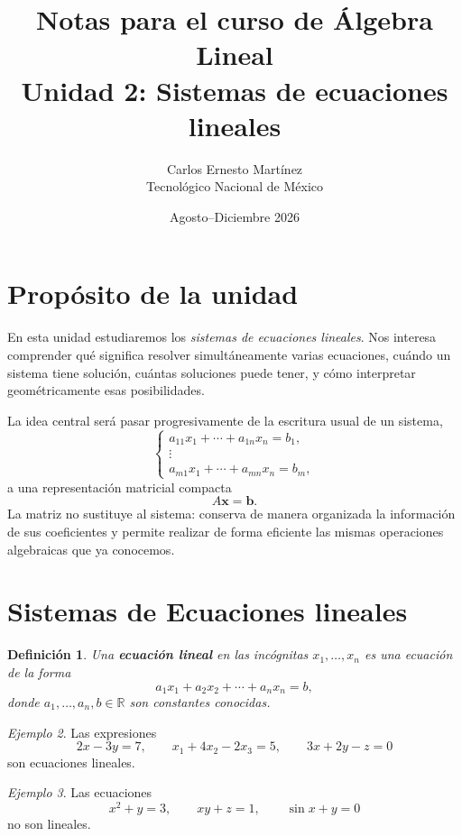 \documentclass[12pt]{article}
\title{\textbf{Notas para el curso de Álgebra Lineal}\\[0.35cm]
\Large Unidad 2: Sistemas de ecuaciones lineales}
\author{Carlos Ernesto Martínez\\Tecnológico Nacional de México}
\date{Agosto--Diciembre 2026}
\newtheorem{definicion}{Definición}[section]
\theoremstyle{remark}
\newtheorem{ejemplo}[definicion]{Ejemplo}
\newcommand{\R}{\mathbb{R}}
\begin{document}
\maketitle
\tableofcontents
\newpage
\section*{Propósito de la unidad}
En esta unidad estudiaremos los \emph{sistemas de ecuaciones lineales}. Nos interesa comprender qué significa resolver simultáneamente varias ecuaciones, cuándo un sistema tiene solución, cuántas soluciones puede tener, y cómo interpretar geométricamente esas posibilidades.

La idea central será pasar progresivamente de la escritura usual de un sistema,
\[
\begin{cases}
a_{11}x_1+\cdots+a_{1n}x_n=b_1,\\
\vdots\\
a_{m1}x_1+\cdots+a_{mn}x_n=b_m,
\end{cases}
\]
a una representación matricial compacta
\[
A\mathbf{x}=\mathbf{b}.
\]
La matriz no sustituye al sistema: conserva de manera organizada la información de sus coeficientes y permite realizar de forma eficiente las mismas operaciones algebraicas que ya conocemos.

\section{Sistemas de Ecuaciones lineales}
\begin{definicion}
Una \textbf{ecuación lineal} en las incógnitas $x_1,\ldots,x_n$ es una ecuación de la forma
\[
a_1x_1+a_2x_2+\cdots+a_nx_n=b,
\]
donde $a_1,\ldots,a_n,b\in\R$ son constantes conocidas.
\end{definicion}


\begin{ejemplo}
Las expresiones
\[
2x-3y=7,\qquad x_1+4x_2-2x_3=5,\qquad 3x+2y-z=0
\]
son ecuaciones lineales.
\end{ejemplo}

\begin{ejemplo}
Las ecuaciones
\[
x^2+y=3,\qquad xy+z=1,\qquad \sin x+y=0
\]
no son lineales.
\end{ejemplo}
\end{document}
